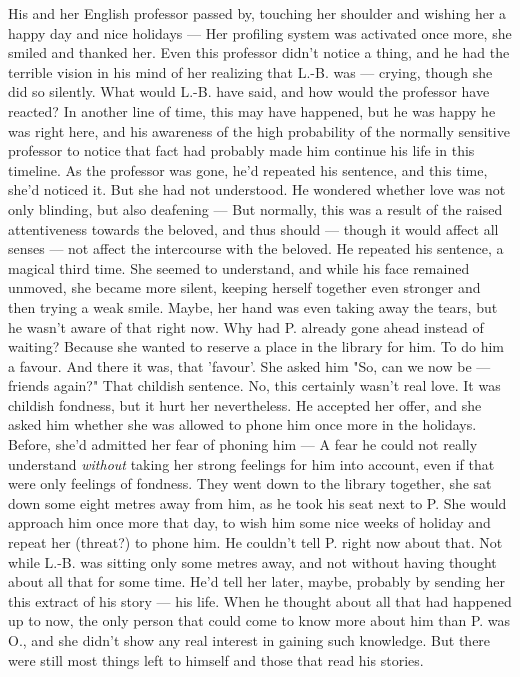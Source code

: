 His and her English professor passed by, touching her shoulder and wishing her a happy day and nice holidays --- Her profiling system was activated once more, she smiled and thanked her. Even this professor didn't notice a thing, and he had the terrible vision in his mind of her realizing that L.-B. was --- crying, though she did so silently. What would L.-B. have said, and how would the professor have reacted? 
In another line of time, this may have happened, but he was happy he was right here, and his awareness of the high probability of the normally sensitive professor to notice that fact had probably made him continue his life in this timeline. 
As the professor was gone, he'd repeated his sentence, and this time, she'd noticed it. But she had not understood. He wondered whether love was not only blinding, but also deafening --- But normally, this was a result of the raised attentiveness towards the beloved, and thus should --- though it would affect all senses --- not affect the intercourse with the beloved. 
He repeated his sentence, a magical third time. She seemed to understand, and while his face remained unmoved, she became more silent, keeping herself together even stronger and then trying a weak smile. Maybe, her hand was even taking away the tears, but he wasn't aware of that right now. Why had P. already gone ahead instead of waiting? Because she wanted to reserve a place in the library for him. To do him a favour. 
And there it was, that 'favour'. She asked him "So, can we now be --- friends again?" That childish sentence. 
No, this certainly wasn't real love. It was childish fondness, but it hurt her nevertheless. 
He accepted her offer, and she asked him whether she was allowed to phone him once more in the holidays. Before, she'd admitted her fear of phoning him --- A fear he could not really understand \emph{without} taking her strong feelings for him into account, even if that were only feelings of fondness. 
They went down to the library together, she sat down some eight metres away from him, as he took his seat next to P. 
She would approach him once more that day, to wish him some nice weeks of holiday and repeat her (threat?) to phone him. 
He couldn't tell P. right now about that. Not while L.-B. was sitting only some metres away, and not without having thought about all that for some time. 
He'd tell her later, maybe, probably by sending her this extract of his story --- his life. 
When he thought about all that had happened up to now, the only person that could come to know more about him than P. was O., and she didn't show any real interest in gaining such knowledge. But there were still most things left to himself and those that read his stories. 
